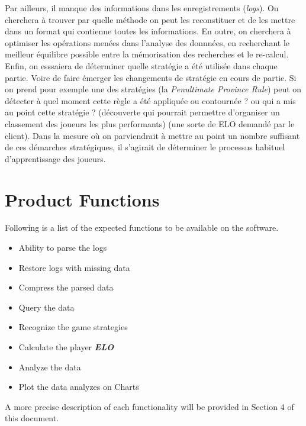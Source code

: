 \documentclass{scrreprt}
\begin{document}
  Par ailleurs, il manque des informations dans les enregistrements (\textit{logs}). On cherchera à trouver par quelle méthode on peut les reconstituer et de les mettre dans un format qui contienne toutes les informations.
  En outre, on cherchera à optimiser les opérations menées dans l'analyse des donnnées, en recherchant le meilleur équilibre possible entre la mémorisation des recherches et le re-calcul.
  Enfin, on esssaiera de déterminer quelle stratégie a été utilisée dans chaque partie. Voire de faire émerger les changements de stratégie en cours de partie. Si on prend pour exemple une des stratégies (la \textit{Penultimate Province Rule}) peut on détecter à quel moment cette règle a été appliquée ou contournée ? ou qui a mis au point cette stratégie ? (découverte qui pourrait permettre d'organiser un classement des joueurs les plus performants) (une sorte de ELO demandé par le client). Dans la mesure où on parviendrait à mettre au point un nombre suffisant de ces démarches stratégiques, il s'agirait de déterminer le processus habituel d'apprentissage des joueurs.

\section{Product Functions}
Following is a list of the expected functions to be available on the software.
\begin{itemize}
  \item{Ability to parse the logs}
  \item{Restore logs with missing data}
  \item{Compress the parsed data }
  \item{Query the data }
  \item{Recognize the game strategies}
  \item{Calculate the player \textit{\textbf{ELO}}}
  \item{Analyze the data}
  \item{Plot the data analyzes on Charts}
\end{itemize}
A more precise description of each functionality will be provided in Section 4 of this document.
\end{document}
